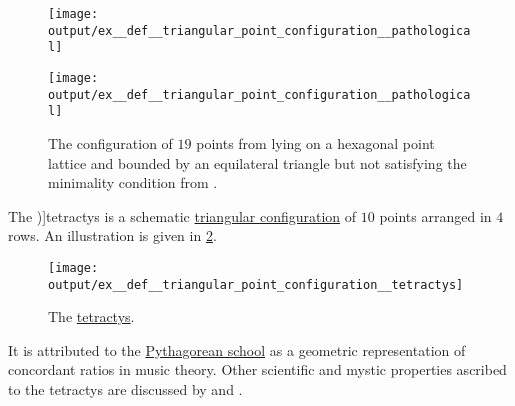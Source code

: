 \begin{example}
\begin{thmenum}
    \begin{figure}[!ht]
      \begin{subcaptionblock}{0.45\textwidth}
        \centering
        \texttt{[image: output/ex\_\_def\_\_triangular\_point\_configuration\_\_pathological]}
      \end{subcaptionblock}
      \hfill
      \begin{subcaptionblock}{0.45\textwidth}
        \centering
        \texttt{[image: output/ex\_\_def\_\_triangular\_point\_configuration\_\_pathological]}
      \end{subcaptionblock}
      \caption{The configuration of \( 19 \) points from  lying on a hexagonal point lattice and bounded by an equilateral triangle but not satisfying the minimality condition from .}\label{fig:ex:def:triangular_point_configuration/pathological}
    \end{figure}

     The \term[ru=тетрактида (\cite[99]{Жмудь1990ПифагорИстория})]{tetractys} is a schematic \hyperref[def:triangular_point_configuration]{triangular configuration} of \( 10 \) points arranged in \( 4 \) rows. An illustration is given in \cref{fig:ex:def:triangular_point_configuration/tetractys}.

    \begin{figure}[!ht]
      \centering
      \texttt{[image: output/ex\_\_def\_\_triangular\_point\_configuration\_\_tetractys]}
      \caption{The \hyperref[ex:def:triangular_point_configuration/tetractys]{tetractys}.}\label{fig:ex:def:triangular_point_configuration/tetractys}
    \end{figure}

    It is attributed to the \hyperref[rem:pythagoreanism]{Pythagorean school} as a geometric representation of concordant ratios in music theory. Other scientific and mystic properties ascribed to the tetractys are discussed  by  and .
  \end{thmenum}
\end{example}

